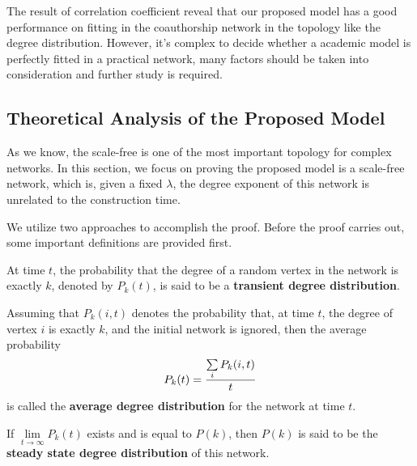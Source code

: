 \documentclass[final]{IEEEtran}
\begin{document}
The result of correlation coefficient reveal that our proposed
model has a good performance on fitting in the coauthorship
network in the topology like the degree distribution. However,
it's complex to decide whether a academic model is perfectly
fitted in a practical network, many factors should be taken into
consideration and further study is required.

\subsection{Theoretical Analysis of the Proposed Model}
As we know, the scale-free is one of the most important topology
for complex networks. In this section, we focus on proving the
proposed model is a scale-free network, which is, given a fixed
$\lambda$, the degree exponent of this network is unrelated to the
construction time.

We utilize two approaches to accomplish the proof. Before the
proof carries out, some important definitions are provided first.

\begin{myDef}\label{d3}
At time $t$, the probability that the degree of a random vertex in
the network is exactly $k$, denoted by $P_{k}(t)$, is said to be a
\textbf{transient degree distribution}.
\end{myDef}

\begin{myDef}\label{d4}
Assuming that $P_{k}(i, t)$ denotes the probability that, at time
$t$, the degree of vertex $i$ is exactly $k$, and the initial
network is ignored, then the average probability
\begin{equation}\footnotesize
P_{k}(t)=\frac{\sum \limits_{i}P_{k}(i, t)}{t}
\end{equation}
is called the \textbf{average degree distribution} for the network
at time $t$.
\end{myDef}

\begin{myDef}\label{d5}
If $\lim \limits_{t\rightarrow\infty}P_{k}(t)$ exists and is equal
to $P(k)$, then $P(k)$ is said to be the \textbf{steady state
degree distribution} of this network.
\end{myDef}

\phantom{blahblah}
\end{document}
